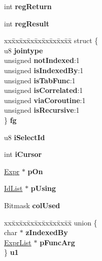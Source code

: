 \begin{DoxyCompactItemize}
int {\bfseries reg\+Return}
\item 
\mbox{\label{struct_src_list_1_1_src_list__item_af4886ed7e335081909c2bfdd5d04c165}} 
int {\bfseries reg\+Result}
\item 
\mbox{\label{struct_src_list_1_1_src_list__item_ac48e79a778e219a29fe083ac57b14a68}} 
\begin{tabbing}
xx\=xx\=xx\=xx\=xx\=xx\=xx\=xx\=xx\=\kill
struct \{\\
\>u8 {\bfseries jointype}\\
\>unsigned {\bfseries notIndexed}:1\\
\>unsigned {\bfseries isIndexedBy}:1\\
\>unsigned {\bfseries isTabFunc}:1\\
\>unsigned {\bfseries isCorrelated}:1\\
\>unsigned {\bfseries viaCoroutine}:1\\
\>unsigned {\bfseries isRecursive}:1\\
\} {\bfseries fg}\\

\end{tabbing}\item 
\mbox{\label{struct_src_list_1_1_src_list__item_a099cfe9b7559b42c49dda02e57188738}} 
u8 {\bfseries i\+Select\+Id}
\item 
\mbox{\label{struct_src_list_1_1_src_list__item_af2e8aae90bd7a00b814db5a2d31f6607}} 
int {\bfseries i\+Cursor}
\item 
\mbox{\label{struct_src_list_1_1_src_list__item_a525f683af2ffa8f094d941a5a4972720}} 
\mbox{\hyperlink{struct_expr}{Expr}} $\ast$ {\bfseries p\+On}
\item 
\mbox{\label{struct_src_list_1_1_src_list__item_a38ecf205dcaebad098b73c56e48ba944}} 
\mbox{\hyperlink{struct_id_list}{Id\+List}} $\ast$ {\bfseries p\+Using}
\item 
\mbox{\label{struct_src_list_1_1_src_list__item_a4fd7e7e26995048b58006d020e8c48d6}} 
Bitmask {\bfseries col\+Used}
\item 
\mbox{\label{struct_src_list_1_1_src_list__item_a40f614e8236f6f76bddcfe21b0545f05}} 
\begin{tabbing}
xx\=xx\=xx\=xx\=xx\=xx\=xx\=xx\=xx\=\kill
union \{\\
\>char $\ast$ {\bfseries zIndexedBy}\\
\>\mbox{\hyperlink{struct_expr_list}{ExprList}} $\ast$ {\bfseries pFuncArg}\\
\} {\bfseries u1}\\


\end{tabbing}
\end{DoxyCompactItemize}
